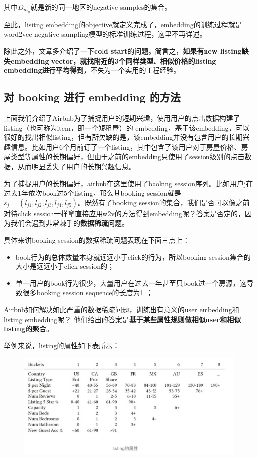 \documentclass[12pt]{article}
\begin{document}
其中$D_{m_n}$就是新的同一地区的negative samples的集合。

至此，lisitng embedding的objective就定义完成了，embedding的训练过程就是word2vec negative sampling模型的标准训练过程，这里不再详述。

除此之外，文章多介绍了一下\textbf{cold start}的问题。简言之，\textbf{如果有new listing缺失embedding vector，就找附近的3个同样类型、相似价格的listing embedding进行平均得到}，不失为一个实用的工程经验。

\subsection{对 booking 进行 embedding 的方法}
上面我们介绍了Airbnb为了捕捉用户的短期兴趣，使用用户的点击数据构建了listing（也可称为item，即一个短租屋）的 embedding，基于该embedding，可以很好的找出相似listing，但有所欠缺的是，该embedding并没有包含用户的长期兴趣信息。比如用户6个月前订了一个listing，其中包含了该用户对于房屋价格、房屋类型等属性的长期偏好，但由于之前的embedding只使用了session级别的点击数据，从而明显丢失了用户的长期兴趣信息。

为了捕捉用户的长期偏好，airbnb在这里使用了booking session序列。比如用户j在过去1年依次book过5个listing，那么其booking session就是$s_j = (l_{j1}, l_{j2}, l_{j3}, l_{j4}, l_{j5})$。既然有了booking session的集合，我们是否可以像之前对待click session一样拿直接应用w2v的方法得到embedding呢？答案是否定的，因为我们会遇到非常棘手的\textbf{数据稀疏}问题。

具体来讲booking session的数据稀疏问题表现在下面三点上：
\begin{itemize}
\setlength{\itemsep}{0pt}
\setlength{\parsep}{0pt}
\setlength{\parskip}{0pt}
    \item book行为的总体数量本身就远远小于click的行为，所以booking session集合的大小是远远小于click session的；
    \item 单一用户的book行为很少，大量用户在过去一年甚至只book过一个房源，这导致很多booking session sequence的长度为1
；
\end{itemize}

Airbnb如何解决如此严重的数据稀疏问题，训练出有意义的user embedding和listing embedding呢？
他们给出的答案是\textbf{基于某些属性规则做相似user和相似listing的聚合}。

举例来说，listing的属性如下表所示：
\begin{figure}[H]
    \centering
    \includegraphics[width=1\textwidth]{fig/Airbnb_Booking_Listing_Attrs.png}
\end{figure}
\end{document}
